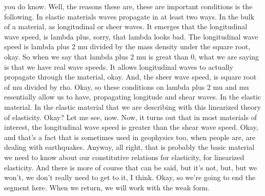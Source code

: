 \documentclass[10pt]{article}
\begin{document}
you do know. Well, the reasons these are, these are important conditions is the following. In elastic materials waves propagate in at least two ways. In the bulk of a material, as longitudinal or sheer waves. It emerges that the longitudinal wave speed, is lambda plus, sorry, that lambda looks bad. The longitudinal wave speed is lambda plus 2 mu divided by the mass density under the square root, okay. So when we say that lambda plus 2 mu is great than 0, what we are saying is that we have real wave speeds. It allows longitudinal waves to actually propagate through the material, okay. And, the sheer wave speed, is square root of mu divided by rho. Okay, so these conditions on lambda plus 2 mu and mu essentially allow us to have, propagating longitude and shear waves. In the elastic material. In the elastic material that we are describing with this linearized theory of elasticity. Okay? Let me see, now. Now, it turns out that in most materials of interest, the longitudinal wave speed is greater than the shear wave speed. Okay, and that's a fact that is sometimes used in geophysics too, when people are, are dealing with earthquakes. Anyway, all right, that is probably the basic material we need to know about our constitutive relations for elasticity, for linearized elasticity. And there is more of course that can be said, but it's not, but, but we won't, we don't really need to get to it, I think. Okay, so we're going to end the segment here. When we return, we will work with the weak form.
\end{document}
